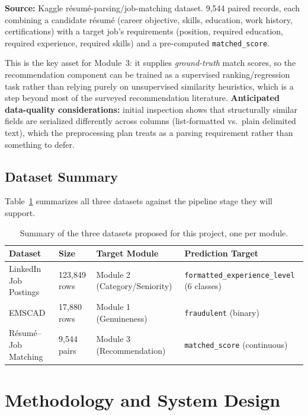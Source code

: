 \documentclass[11pt,a4paper]{article}
\begin{document}
\textbf{Source:} Kaggle r\'esum\'e-parsing/job-matching dataset. 9{,}544 paired records,
each combining a candidate r\'esum\'e (career objective, skills, education, work
history, certifications) with a target job's requirements (position, required
education, required experience, required skills) and a pre-computed \texttt{matched\_score}.

This is the key asset for Module~3: it supplies \emph{ground-truth} match scores, so the
recommendation component can be trained as a supervised ranking/regression task rather
than relying purely on unsupervised similarity heuristics, which is a step beyond most of
the surveyed recommendation literature. \textbf{Anticipated data-quality considerations:}
initial inspection shows that structurally similar fields are serialized differently
across columns (list-formatted vs.\ plain delimited text), which the preprocessing plan
treats as a parsing requirement rather than something to defer.

\subsection{Dataset Summary}

Table~\ref{tab:dataset-summary} summarizes all three datasets against the pipeline stage
they will support.

\begin{table}[h]
\centering
\small
\begin{tabular}{@{}p{3.2cm}p{1.9cm}p{3.6cm}p{5.2cm}@{}}
\toprule
\textbf{Dataset} & \textbf{Size} & \textbf{Target Module} & \textbf{Prediction Target} \\
\midrule
LinkedIn Job Postings & 123{,}849 rows & Module 2 (Category/Seniority) &
\texttt{formatted\_experience\_level} (6 classes) \\
EMSCAD & 17{,}880 rows & Module 1 (Genuineness) & \texttt{fraudulent} (binary) \\
R\'esum\'e--Job Matching & 9{,}544 pairs & Module 3 (Recommendation) &
\texttt{matched\_score} (continuous) \\
\bottomrule
\end{tabular}
\caption{Summary of the three datasets proposed for this project, one per module.}
\label{tab:dataset-summary}
\end{table}

\section{Methodology and System Design}
\label{sec:methodology}
\end{document}
